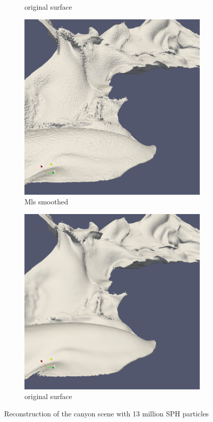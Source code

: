 \begin{figure}
\begin{center}
\begin{subfigure}[b]{0.47\textwidth}
			\caption{original surface}
		\end{subfigure}
		\begin{subfigure}[b]{0.47\textwidth}
			\includegraphics[width=\textwidth]{figures/CanionOriginal4.png}
			\caption{Mls smoothed}
		\end{subfigure}
		\begin{subfigure}[b]{0.47\textwidth}
			\includegraphics[width=\textwidth]{figures/CanionMls4.png}
			\caption{original surface}
		\end{subfigure}
	\end{center}
	\caption{Reconstruction of the canyon scene with 13 million SPH particles } \label{fig:db_mls_reconstruction4}
\end{figure}

